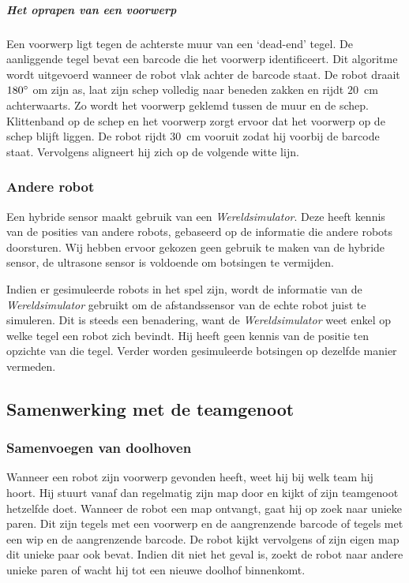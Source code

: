 \documentclass[eind]{penoverslag}
\begin{document}
\subparagraph{Het oprapen van een voorwerp}
Een voorwerp ligt tegen de achterste muur van een `dead-end' tegel. De aanliggende tegel bevat een barcode die het voorwerp identificeert. Dit algoritme wordt uitgevoerd wanneer de robot vlak achter de barcode staat. De robot draait $180\degree$ om zijn as, laat zijn schep volledig naar beneden zakken en rijdt $20$~cm achterwaarts. Zo wordt het voorwerp geklemd tussen de muur en de schep. Klittenband op de schep en het voorwerp zorgt ervoor dat het voorwerp op de schep blijft liggen. De robot rijdt $30$~cm vooruit zodat hij voorbij de barcode staat. Vervolgens aligneert hij zich op de volgende witte lijn.

\subsubsection{Andere robot}
\label{sssec:AlgoCollision}
Een hybride sensor maakt gebruik van een \textit{Wereldsimulator}.
Deze heeft kennis van de posities van andere robots,
gebaseerd op de informatie die andere robots doorsturen.
Wij hebben ervoor gekozen geen gebruik te maken van de hybride sensor,
de ultrasone sensor is voldoende om botsingen te vermijden.

Indien er gesimuleerde robots in het spel zijn,
wordt de informatie van de \textit{Wereldsimulator} gebruikt om de
afstandssensor van de echte robot juist te simuleren.
Dit is steeds een benadering, want de \textit{Wereldsimulator} weet
enkel op welke tegel een robot zich bevindt.
Hij heeft geen kennis van de positie ten opzichte van die tegel.
Verder worden gesimuleerde botsingen op dezelfde manier vermeden.\\

\subsection{Samenwerking met de teamgenoot}
\label{ssec:AlgoSamen}

\subsubsection{Samenvoegen van doolhoven}
\label{sssec:AlgoMappen}
Wanneer een robot zijn voorwerp gevonden heeft, weet hij bij welk team hij hoort. Hij stuurt vanaf dan regelmatig zijn map door en kijkt of zijn teamgenoot hetzelfde doet.
Wanneer de robot een map ontvangt, gaat hij op zoek naar unieke paren. Dit zijn tegels met een voorwerp en de aangrenzende barcode of tegels met een wip en de aangrenzende barcode. De robot kijkt vervolgens of zijn eigen map dit unieke paar ook bevat. Indien dit niet het geval is, zoekt de robot naar andere unieke paren of wacht hij tot een nieuwe doolhof binnenkomt.
\end{document}
